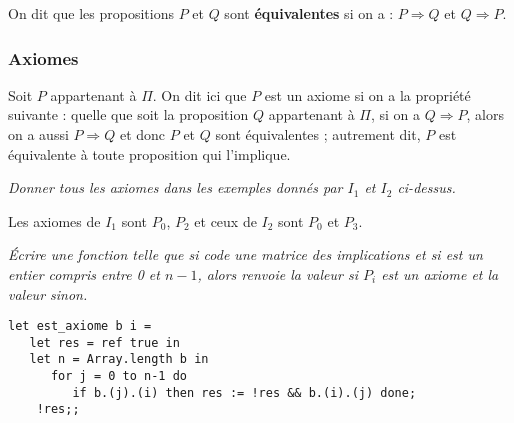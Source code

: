 On dit que les propositions $P$ et $Q$ sont {\bf équivalentes} si on a :
$P \Rightarrow Q$ et $Q \Rightarrow P$.
\subsubsection{Axiomes}
Soit $P$ appartenant à $\Pi$. On dit ici que $P$ est un axiome si on a la propriété suivante : quelle que soit la proposition $Q$ appartenant à $\Pi$, si on a $Q\Rightarrow P$, alors on a aussi $P\Rightarrow Q$ et donc $P$ et $Q$ sont équivalentes ; autrement dit, $P$ est équivalente à toute proposition qui l'implique.  
\begin{Exercise}\it
Donner tous les axiomes dans les exemples donnés par $I_1$ et $I_2$ ci-dessus.
\end{Exercise}
\begin{Answer}Les axiomes de $I_1$ sont $P_{0}$, $P_{2}$ et ceux de $I_2$ sont $P_{0}$ et $P_{3}$.
\end{Answer}
\begin{Exercise}\it
Écrire une fonction  telle que si  code une matrice des implications et si  est un entier compris entre 0 et $n - 1$, alors  renvoie la valeur  si $P_{i}$ est un axiome et la valeur  sinon.
\end{Exercise}
\begin{Answer}
\begin{lstlisting}
let est_axiome b i =
   let res = ref true in
   let n = Array.length b in
      for j = 0 to n-1 do
         if b.(j).(i) then res := !res && b.(i).(j) done;
    !res;;
\end{lstlisting}
\end{Answer}

